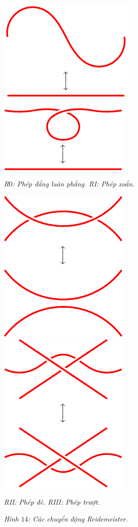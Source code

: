 \begin{multicols}{2}
\begin{figure}[H]
		\includegraphics[width= 0.4\linewidth]{R0.pdf}\quad
		\includegraphics[width= 0.4\linewidth]{R1.pdf}
		\caption{\small\textit{\color{duongvaotoanhoc}R$0$: Phép đẳng luân phẳng.\hspace*{20pt}  RI: Phép xoắn.}}
		\includegraphics[width= 0.4\linewidth]{R2.pdf}\quad
		\includegraphics[width= 0.4\linewidth]{R3.pdf}
		\caption{\small\textit{\color{duongvaotoanhoc}RII: Phép đè.\hspace*{30pt} RIII: Phép trượt.}}
		\caption{\small\textit{\color{duongvaotoanhoc}Hình $14$: Các chuyển động Reidemeister.}}

\end{figure}
\end{multicols}
